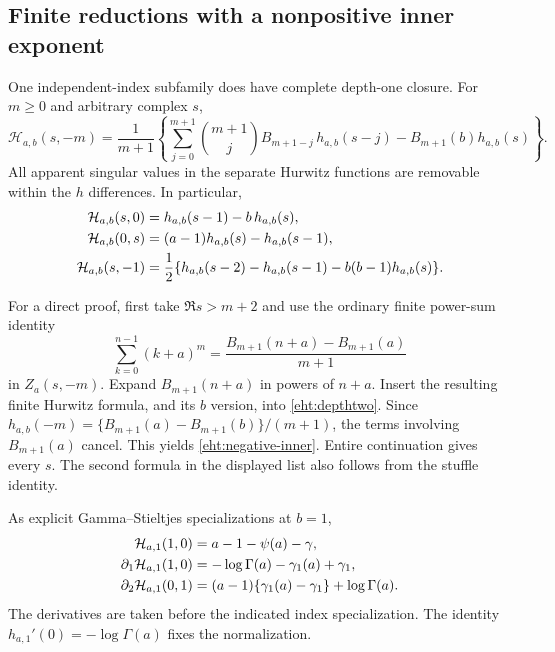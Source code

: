 \subsection{Finite reductions with a nonpositive inner exponent}

One independent-index subfamily does have complete depth-one closure.
For $m\ge0$ and arbitrary complex $s$,
\begin{equation}\label{eht:negative-inner}
 \boxed{\mathcal H_{a,b}(s,-m)=\frac1{m+1}
 \left\{\sum_{j=0}^{m+1}\binom{m+1}{j}B_{m+1-j}\,
                       h_{a,b}(s-j)
          -B_{m+1}(b)h_{a,b}(s)\right\}.}
\end{equation}
All apparent singular values in the separate Hurwitz functions are
removable within the $h$ differences.  In particular,
\begin{align}
 \mathcal H_{a,b}(s,0)&=h_{a,b}(s-1)-b\,h_{a,b}(s),
        \label{eht:zero-inner}\\
 \mathcal H_{a,b}(0,s)&=(a-1)h_{a,b}(s)-h_{a,b}(s-1),\notag\\
 \mathcal H_{a,b}(s,-1)&=\frac12\{h_{a,b}(s-2)-h_{a,b}(s-1)
                                -b(b-1)h_{a,b}(s)\}.\notag
\end{align}

For a direct proof, first take $\Re s>m+2$ and use the ordinary finite
power-sum identity
\[
 \sum_{k=0}^{n-1}(k+a)^m
       =\frac{B_{m+1}(n+a)-B_{m+1}(a)}{m+1}
\]
in $Z_a(s,-m)$.  Expand $B_{m+1}(n+a)$ in powers of $n+a$.
Insert the resulting finite Hurwitz formula, and its $b$ version, into
\eqref{eht:depthtwo}.  Since
$h_{a,b}(-m)=\{B_{m+1}(a)-B_{m+1}(b)\}/(m+1)$, the terms involving
$B_{m+1}(a)$ cancel.  This yields \eqref{eht:negative-inner}.  Entire
continuation gives every $s$.  The second formula in the displayed list
also follows from the stuffle identity.

As explicit Gamma--Stieltjes specializations at $b=1$,
\begin{align}
 \mathcal H_{a,1}(1,0)&=a-1-\psi(a)-\gamma,\notag\\
 \partial_1\mathcal H_{a,1}(1,0)
   &=-\log\Gamma(a)-\gamma_1(a)+\gamma_1,\label{eht:Gamma-Stieltjes}\\
 \partial_2\mathcal H_{a,1}(0,1)
   &=(a-1)\{\gamma_1(a)-\gamma_1\}+\log\Gamma(a).\notag
\end{align}
The derivatives are taken before the indicated index specialization.
The identity $h_{a,1}'(0)=-\log\Gamma(a)$ fixes the normalization.

